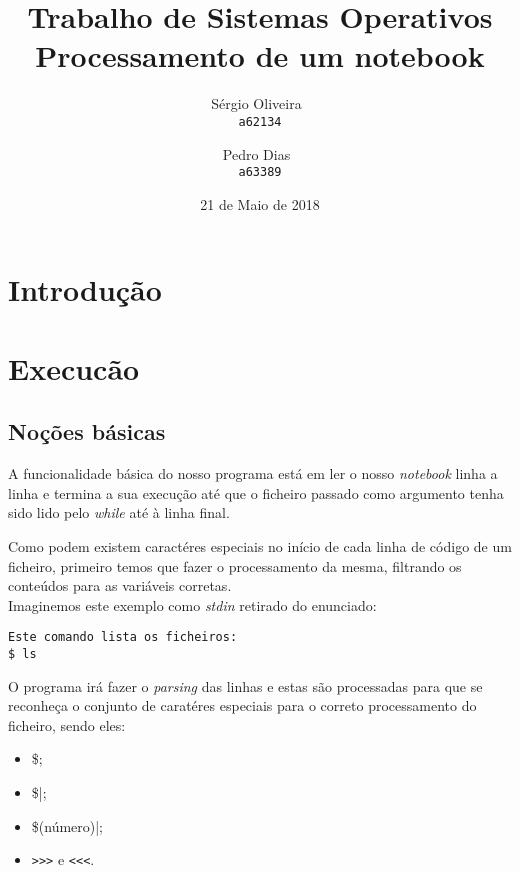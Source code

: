\documentclass[11pt,a4paper]{report}
\begin{document}
\title{Trabalho de Sistemas Operativos\\Processamento de um notebook}
\author{
   Sérgio Oliveira~\\
   \texttt{a62134}
   \and
   Pedro Dias~\\
   \texttt{a63389}
}
\date{21 de Maio de 2018}
\maketitle
\raggedbottom
\pagebreak
\pagebreak


\tableofcontents
\pagebreak
\chapter{Introdução}
\raggedbottom
\pagebreak


\chapter{Execucão}
\section{Noções básicas}

A funcionalidade básica do nosso programa está em ler o nosso \textit{notebook} linha a linha e termina a sua execução até que o ficheiro passado como argumento tenha sido lido pelo \textit{while} até à linha final.

Como podem existem caractéres especiais no início de cada linha de código de um ficheiro, primeiro temos que fazer o processamento da mesma, filtrando os conteúdos para as variáveis corretas.
~\\

Imaginemos este exemplo como \textit{stdin} retirado do enunciado:
\begin{verbatim}
Este comando lista os ficheiros:
$ ls
\end{verbatim}

O programa irá fazer o \textit{parsing} das linhas e estas são processadas para que se reconheça o conjunto de caratéres especiais para o correto processamento do ficheiro, sendo eles:

\begin{itemize}
\item \$; 
\item \$|;
\item \$(número)|;
\item \verb|>>>| e \verb|<<<|.
\end{itemize}
\end{document}
